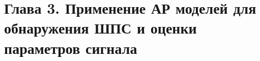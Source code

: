 


\section{Глава 3. Применение АР моделей для обнаружения ШПС и оценки параметров сигнала }







